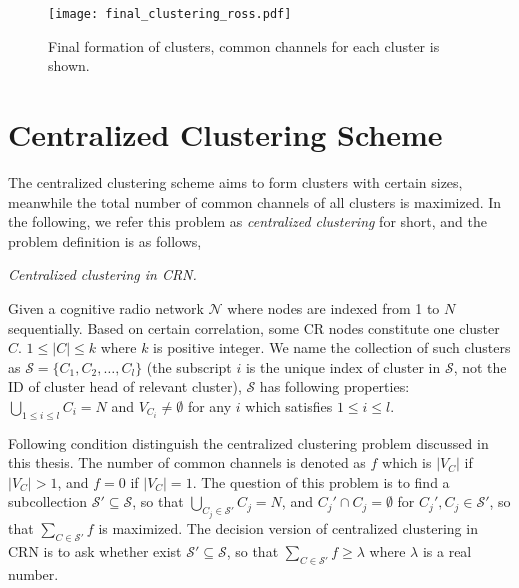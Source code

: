 \begin{figure}[ht!]
  \centering
  \texttt{[image: final\_clustering\_ross.pdf]}
  \caption{Final formation of clusters, common channels for each cluster is shown.}
  \label{fig4}
\end{figure}


\newpage
\section{Centralized Clustering Scheme}
\label{centralized_scheme}



The centralized clustering scheme aims to form clusters with certain sizes, meanwhile the total number of common channels of all clusters is maximized.
In the following, we refer this problem as \textit{centralized clustering} for short, and the problem definition is as follows, 


\begin{mydef}
\label{def_centralized_clustering}
\textit{Centralized clustering in CRN.}

Given a cognitive radio network $\mathcal{N}$ where nodes are indexed from 1 to $N$ sequentially.
Based on certain correlation, some CR nodes constitute one cluster $C$.
$1\leq |C| \leqslant k$ where $k$ is positive integer.
We name the collection of such clusters as $\mathcal{S}=\{C_1, C_2,\ldots,C_l\}$ (the subscript $i$ is the unique index of cluster in $\mathcal{S}$, not the ID of cluster head of relevant cluster), $\mathcal{S}$ has following properties: $\bigcup_{1\leq i \leq l} C_i = N$ and $V_{C_i}\neq \emptyset$ for any $i$ which satisfies $1\leq i \leq l$.

Following condition distinguish the centralized clustering problem discussed in this thesis.
The number of common channels is denoted as $f$ which is $|V_{C}|$ if $|V_{C}|>1$, and $f=0$ if $|V_{C}|=1$.
The question of this problem is to find a subcollection $\mathcal{S}' \subseteq \mathcal{S}$, so that $\bigcup_{C_j\in \mathcal{S}'} C_j = N$, and $C_j'\cap C_j =\emptyset$ for $C_j', C_j\in \mathcal{S}'$, so that $\sum_{C\in \mathcal{S}'} f$ is maximized.
The decision version of centralized clustering in CRN is to ask whether exist $\mathcal{S}'\subseteq \mathcal{S}$, so that $\sum_{C\in \mathcal{S}'} f \geqslant \lambda$ where $\lambda$ is a real number.%
\end{mydef}


